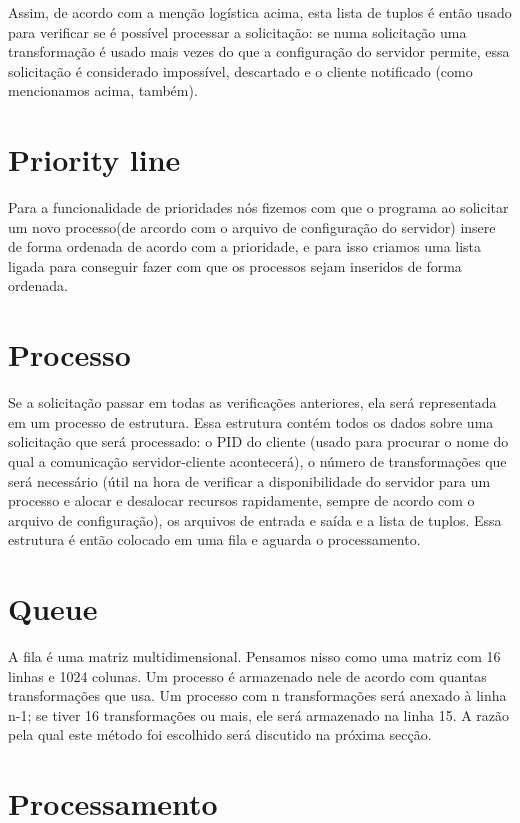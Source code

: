 \documentclass[a4paper]{report}
\begin{document}
    Assim, de acordo com a menção logística acima, esta lista de tuplos é então usado para verificar se é possível processar a solicitação: se numa solicitação uma transformação é usado mais vezes do que a configuração do servidor permite, essa solicitação é considerado impossível, descartado e o cliente notificado (como mencionamos acima, também).
    
    \section{Priority line}
    
    Para a funcionalidade de prioridades nós fizemos com que o programa ao solicitar um novo processo(de arcordo com o arquivo de configuração do servidor) insere de forma ordenada de acordo com a prioridade, e para isso criamos uma lista ligada para conseguir fazer com que os processos sejam inseridos de forma ordenada.
    
    \section{Processo}
    
    Se a solicitação passar em todas as verificações anteriores, ela será representada em um processo de estrutura. Essa estrutura contém todos os dados sobre uma solicitação que será processado: o PID do cliente (usado para procurar o nome do qual a comunicação servidor-cliente acontecerá), o número de transformações que será necessário (útil na hora de verificar a disponibilidade do servidor para um processo e alocar e desalocar recursos rapidamente, sempre de acordo com o arquivo de configuração), os arquivos de entrada e saída e a lista de tuplos. Essa estrutura é então colocado em uma fila e aguarda o processamento.
    
    \section{Queue}
    A fila é uma matriz multidimensional. Pensamos nisso como uma matriz com 16 linhas e 1024 colunas. Um processo é armazenado nele de acordo com quantas transformações que usa. Um processo com n transformações será anexado à linha n-1; se tiver 16 transformações ou mais, ele será armazenado na linha 15. A razão pela qual este método foi escolhido será discutido na próxima secção.
	
	\section{Processamento}
	
\end{document}
